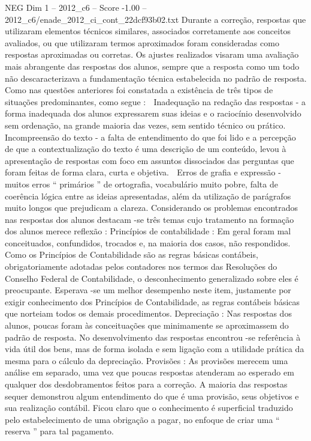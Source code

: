 \begin{textsample}{NEG Dim 1 – 2012\_c6 – Score -1.00 – 2012\_c6/enade\_2012\_ci\_cont\_22dcf93b02.txt}
Durante a correção, respostas que utilizaram elementos técnicos similares, associados corretamente aos conceitos avaliados, ou que utilizaram termos aproximados foram consideradas como respostas aproximadas ou corretas.
Os ajustes realizados visaram uma avaliação mais abrangente das respostas dos alunos, sempre que a resposta como um todo não descaracterizava a fundamentação técnica estabelecida no padrão de resposta.
Como nas questões anteriores foi constatada a existência de três tipos de situações predominantes, como segue :  Inadequação na redação das respostas - a forma inadequada dos alunos expressarem suas ideias e o raciocínio desenvolvido sem ordenação, na grande maioria das vezes, sem sentido técnico ou prático.  Incompreensão do texto - a falta de entendimento do que foi lido e a percepção de que a contextualização do texto é uma descrição de um conteúdo, levou à apresentação de respostas com foco em assuntos dissociados das perguntas que foram feitas de forma clara, curta e objetiva.  Erros de grafia e expressão - muitos erros “ primários ” de ortografia, vocabulário muito pobre, falta de coerência lógica entre as ideias apresentadas, além da utilização de parágrafos muito longos que prejudicam a clareza.
Considerando os problemas encontrados nas respostas dos alunos destacam -se três temas cujo tratamento na formação dos alunos merece reflexão : Princípios de contabilidade : Em geral foram mal conceituados, confundidos, trocados e, na maioria dos casos, não respondidos.
Como os Princípios de Contabilidade são as regras básicas contábeis, obrigatoriamente adotadas pelos contadores nos termos das Resoluções do Conselho Federal de Contabilidade, o desconhecimento generalizado sobre eles é preocupante.
Esperava -se um melhor desempenho neste item, justamente por exigir conhecimento dos Princípios de Contabilidade, as regras contábeis básicas que norteiam todos os demais procedimentos.
Depreciação : Nas respostas dos alunos, poucas foram às conceituações que minimamente se aproximassem do padrão de resposta.
No desenvolvimento das respostas encontrou -se referência à vida útil dos bens, mas de forma isolada e sem ligação com a utilidade prática da mesma para o cálculo da depreciação.
Provisões : As provisões merecem uma análise em separado, uma vez que poucas respostas atenderam ao esperado em qualquer dos desdobramentos feitos para a correção.
A maioria das respostas sequer demonstrou algum entendimento do que é uma provisão, seus objetivos e sua realização contábil.
Ficou claro que o conhecimento é superficial traduzido pelo estabelecimento de uma obrigação a pagar, no enfoque de criar uma “ reserva ” para tal pagamento.

\end{textsample}
